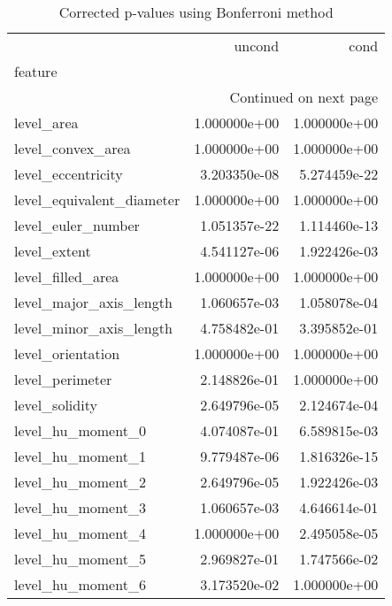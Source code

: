 \begin{longtable}{lrr}
	\caption[Corrected p-values]{ \small Corrected p-values using Bonferroni method}\\
	\toprule
	{} &         uncond &           cond \\
	feature                       &                &                \\
	\midrule
	\endhead
	\midrule
	\multicolumn{3}{r}{{Continued on next page}} \\
	\midrule
	\endfoot
	
	\bottomrule
	\endlastfoot
	level\_area                    &   1.000000e+00 &   1.000000e+00 \\
	level\_convex\_area             &   1.000000e+00 &   1.000000e+00 \\
	level\_eccentricity            &   3.203350e-08 &   5.274459e-22 \\
	level\_equivalent\_diameter     &   1.000000e+00 &   1.000000e+00 \\
	level\_euler\_number            &   1.051357e-22 &   1.114460e-13 \\
	level\_extent                  &   4.541127e-06 &   1.922426e-03 \\
	level\_filled\_area             &   1.000000e+00 &   1.000000e+00 \\
	level\_major\_axis\_length       &   1.060657e-03 &   1.058078e-04 \\
	level\_minor\_axis\_length       &   4.758482e-01 &   3.395852e-01 \\
	level\_orientation             &   1.000000e+00 &   1.000000e+00 \\
	level\_perimeter               &   2.148826e-01 &   1.000000e+00 \\
	level\_solidity                &   2.649796e-05 &   2.124674e-04 \\
	level\_hu\_moment\_0             &   4.074087e-01 &   6.589815e-03 \\
	level\_hu\_moment\_1             &   9.779487e-06 &   1.816326e-15 \\
	level\_hu\_moment\_2             &   2.649796e-05 &   1.922426e-03 \\
	level\_hu\_moment\_3             &   1.060657e-03 &   4.646614e-01 \\
	level\_hu\_moment\_4             &   1.000000e+00 &   2.495058e-05 \\
	level\_hu\_moment\_5             &   2.969827e-01 &   1.747566e-02 \\
	level\_hu\_moment\_6             &   3.173520e-02 &   1.000000e+00 \\

\end{longtable}
